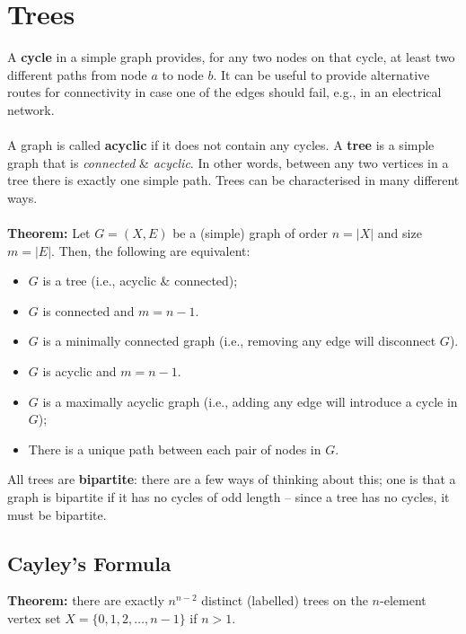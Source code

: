 \documentclass[a4paper,11pt]{article}
\begin{document}
\section{Trees}
A \textbf{cycle} in a simple graph provides, for any two nodes on that cycle, at least two different paths from node $a$ to node $b$.
It can be useful to provide alternative routes for connectivity in case one of the edges should fail, e.g., in an electrical network.
\\\\
A graph is called \textbf{acyclic} if it does not contain any cycles.
A \textbf{tree} is a simple graph that is \textit{connected} \& \textit{acyclic}.
In other words, between any two vertices in a tree there is exactly one simple path.
Trees can be characterised in many different ways.
\\\\
\textbf{Theorem:} Let $G=(X,E)$ be a (simple) graph of order $n=|X|$ and size $m=|E|$.
Then, the following are equivalent:
\begin{itemize}
    \item   $G$ is a tree (i.e., acyclic \& connected);
    \item   $G$ is connected and $m=n-1$.
    \item   $G$ is a minimally connected graph (i.e., removing any edge will disconnect $G$).
    \item   $G$ is acyclic and $m=n-1$.
    \item   $G$ is a maximally acyclic graph (i.e., adding any edge will introduce a cycle in $G$);
    \item   There is a unique path between each pair of nodes in $G$.
\end{itemize}

All trees are \textbf{bipartite}:
there are a few ways of thinking about this;
one is that a graph is bipartite if it has no cycles of odd length -- since a tree has no cycles, it must be bipartite.

\subsection{Cayley's Formula}
\textbf{Theorem:} there are exactly $n^{n-2}$ distinct (labelled) trees on the $n$-element vertex set $X=\{0,1,2, \dots, n-1\}$ if $n>1$.
\end{document}
